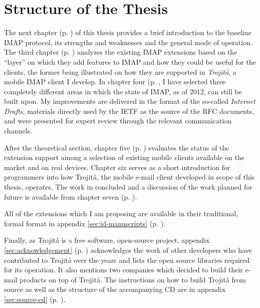 \documentclass[trojita]{subfiles}
\begin{document}
\section{Structure of the Thesis}

The next chapter (p. \pageref{sec:imap-protocol}) of this thesis provides a brief introduction to the baseline IMAP
protocol, its strengths and weaknesses and the general mode of operation.  The third chapter (p.
\pageref{sec:imap-extensions}) analyzes the existing IMAP extensions based on the ``layer'' on which they add features
to IMAP and how they could be useful for the clients, the former being illustrated on how they are supported in {\em
Trojitá}, a mobile IMAP client I develop.  In chapter four (p.  \pageref{sec:proposed-extensions}, I have selected three
completely different areas in which the state of IMAP, as of 2012, can still be built upon.  My improvements are
delivered in the format of the so-called {\em Internet Drafts}, materials directly used by the IETF as the source of the
RFC documents, and were presented for expert review through the relevant communication channels.

After the theoretical section, chapter five (p. \pageref{sec:mobile-imap}) evaluates the status of the extension support
among a selection of existing mobile clients available on the market and on real devices.  Chapter six serves as a
short introduction for programmers into how Trojitá, the mobile e-mail client developed in scope of this thesis,
operates.  The work in concluded and a discussion of the work planned for future is available from chapter seven (p.
\pageref{sec:conclusion}).

All of the extensions which I am proposing are available in their traditional, formal format in appendix \ref{sec:id-manuscripts}
(p. \pageref{sec:id-manuscripts}).

Finally, as Trojitá is a free software, open-source project, appendix \ref{sec:acknowledgement} (p.
\pageref{sec:acknowledgement}) acknowledges the work of other developers who have contributed to Trojitá over the years
and lists the open source libraries required for its operation.  It also mentions two companies which decided to build
their e-mail products on top of Trojitá.  The instructions on how to build Trojitá from source as well as the structure
of the accompanying CD are in appendix \ref{sec:source-cd} (p. \pageref{sec:source-cd}).
\end{document}
